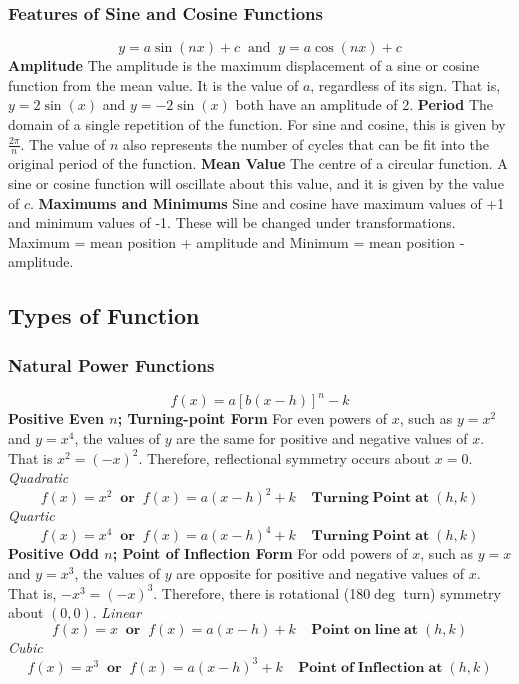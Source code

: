 \documentclass{article}
\begin{document}
			\subsubsection{Features of Sine and Cosine Functions}
				\[y=a\sin(nx)+c\;\;\text{and}\;\;y=a\cos(nx)+c\]
				\textbf{Amplitude}\newline
				The amplitude is the maximum displacement of a sine or cosine function from the mean value. It is the value of $a$, regardless of its sign. That is, $y=2\sin(x)$ and $y=-2\sin(x)$ both have an amplitude of 2.
				\newline\newline
				\textbf{Period}
				The domain of a single repetition of the function. For sine and cosine, this is given by $\frac{2\pi}{n}$. The value of $n$ also represents the number of cycles that can be fit into the original period of the function.
				\newline\newline
				\textbf{Mean Value}\newline
				The centre of a circular function. A sine or cosine function will oscillate about this value, and it is given by the value of $c$.
				\newline\newline
				\textbf{Maximums and Minimums}\newline
				Sine and cosine have maximum values of +1 and minimum values of -1. These will be changed under transformations. Maximum = mean position + amplitude and Minimum = mean position - amplitude.
		\subsection{Types of Function}
			\subsubsection{Natural Power Functions}
				\[f(x)=a[b(x-h)]^n - k\]
				\textbf{Positive Even \boldmath$n$; Turning-point Form}\newline
				For even powers of $x$, such as $y=x^2$ and $y=x^4$, the values of $y$ are the same for positive and negative values of $x$. That is $x^2=(-x)^2$. Therefore, reflectional symmetry occurs about $x=0$.\newline
				\textit{Quadratic}
				\[f(x)=x^2\;\;\mathbf{or}\;\;f(x)=a(x-h)^2+k\;\;\;\;\mathbf{Turning\;Point\;at}\;(h,k)\]
				\textit{Quartic}
				\[f(x)=x^4\;\;\mathbf{or}\;\;f(x)=a(x-h)^4+k\;\;\;\;\mathbf{Turning\;Point\;at}\;(h,k)\]
				\newline
				\textbf{Positive Odd \boldmath$n$; Point of Inflection Form}\newline
				For odd powers of $x$, such as $y=x$ and $y=x^3$, the values of $y$ are opposite for positive and negative values of $x$. That is, $-x^3=(-x)^3$. Therefore, there is rotational (180$\deg$ turn) symmetry about $(0,0)$.\newline
				\textit{Linear}
				\[f(x)=x\;\;\mathbf{or}\;\;f(x)=a(x-h)+k\;\;\;\;\mathbf{Point\;on\;line\;at}\;(h,k)\]
				\textit{Cubic}
				\[f(x)=x^3\;\;\mathbf{or}\;\;f(x)=a(x-h)^3+k\;\;\;\;\mathbf{Point\;of\;Inflection\;at}\;(h,k)\]
			\newpage
\end{document}

